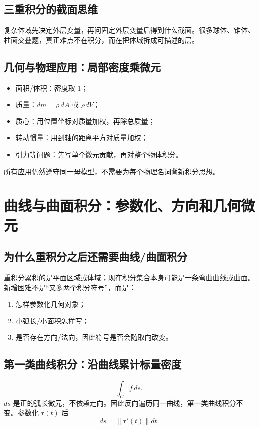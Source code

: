 \documentclass[11pt,a4paper,openany]{ctexbook}
\begin{document}
\section{三重积分的截面思维}
复杂体域先决定外层变量，再问固定外层变量后得到什么截面。很多球体、锥体、柱面交叠题，真正难点不在积分，而在把体域拆成可描述的层。

\section{几何与物理应用：局部密度乘微元}
\begin{itemize}
  \item 面积/体积：密度取 1；
  \item 质量：$dm=\rho\,dA$ 或 $\rho\,dV$；
  \item 质心：用位置坐标对质量加权，再除总质量；
  \item 转动惯量：用到轴的距离平方对质量加权；
  \item 引力等问题：先写单个微元贡献，再对整个物体积分。
\end{itemize}
所有应用仍然遵守同一母模型，不需要为每个物理名词背新积分思想。

\chapter{曲线与曲面积分：参数化、方向和几何微元}

\section{为什么重积分之后还需要曲线/曲面积分}
重积分累积的是平面区域或体域；现在积分集合本身可能是一条弯曲曲线或曲面。新增困难不是“又多两个积分符号”，而是：
\begin{enumerate}
  \item 怎样参数化几何对象；
  \item 小弧长/小面积怎样写；
  \item 是否存在方向/法向，因此符号是否会随取向改变。
\end{enumerate}

\section{第一类曲线积分：沿曲线累计标量密度}
\[
\int_C f\,ds.
\]
$ds$ 是正的弧长微元，不依赖走向。因此反向遍历同一曲线，第一类曲线积分不变。参数化 $\bm r(t)$ 后
\[
ds=\|\bm r'(t)\|dt.
\]
\end{document}
